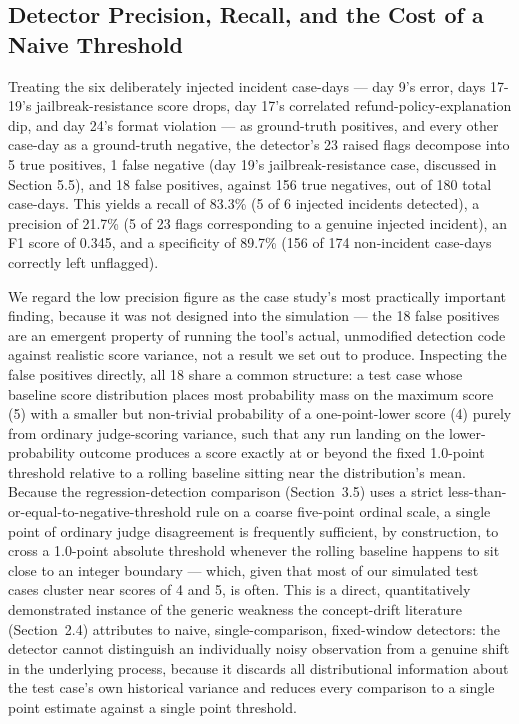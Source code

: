 \documentclass[11pt,a4paper]{article}
\begin{document}
\subsection{Detector Precision, Recall, and the Cost of a Naive Threshold}

Treating the six deliberately injected incident case-days --- day
9's error, days 17-19's
jailbreak-resistance score drops, day 17's correlated
refund-policy-explanation dip, and day 24's format
violation --- as ground-truth positives, and every other case-day as a
ground-truth negative, the detector's 23 raised flags
decompose into 5 true positives, 1 false negative (day
19's jailbreak-resistance case, discussed in Section
5.5), and 18 false positives, against 156 true negatives, out of 180
total case-days. This yields a recall of 83.3\% (5 of 6 injected
incidents detected), a precision of 21.7\% (5 of 23 flags corresponding
to a genuine injected incident), an F1 score of 0.345, and a specificity
of 89.7\% (156 of 174 non-incident case-days correctly left unflagged).

We regard the low precision figure as the case study's
most practically important finding, because it was not designed into the
simulation --- the 18 false positives are an emergent property of
running the tool's actual, unmodified detection code
against realistic score variance, not a result we set out to produce.
Inspecting the false positives directly, all 18 share a common
structure: a test case whose baseline score distribution places most
probability mass on the maximum score (5) with a smaller but non-trivial
probability of a one-point-lower score (4) purely from ordinary
judge-scoring variance, such that any run landing on the
lower-probability outcome produces a score exactly at or beyond the
fixed 1.0-point threshold relative to a rolling baseline sitting near
the distribution's mean. Because the
regression-detection comparison (Section~3.5) uses a strict
less-than-or-equal-to-negative-threshold rule on a coarse five-point
ordinal scale, a single point of ordinary judge disagreement is
frequently sufficient, by construction, to cross a 1.0-point absolute
threshold whenever the rolling baseline happens to sit close to an
integer boundary --- which, given that most of our simulated test cases
cluster near scores of 4 and 5, is often. This is a direct,
quantitatively demonstrated instance of the generic weakness the
concept-drift literature (Section~2.4) attributes to naive,
single-comparison, fixed-window detectors: the detector cannot
distinguish an individually noisy observation from a genuine shift in
the underlying process, because it discards all distributional
information about the test case's own historical
variance and reduces every comparison to a single point estimate against
a single point threshold.
\end{document}
